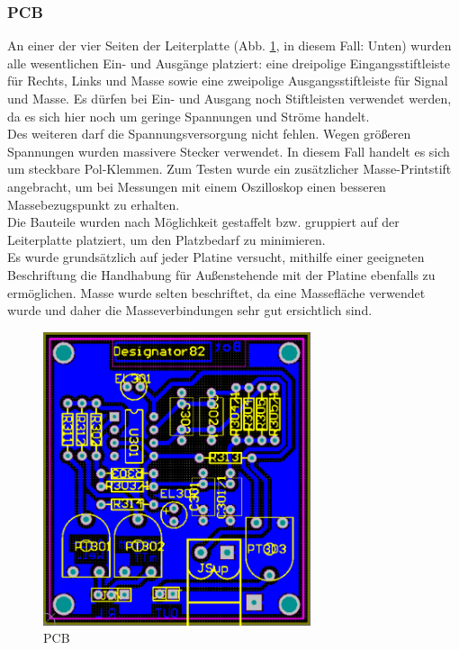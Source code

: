 \subsubsection{PCB}\label{subsec:5.5.3}
An einer der vier Seiten der Leiterplatte (Abb. \ref{fig:5.5.3.1}, in diesem Fall: Unten) wurden alle wesentlichen Ein- und Ausgänge platziert: eine dreipolige Eingangsstiftleiste für Rechts, Links und Masse sowie eine zweipolige Ausgangsstiftleiste für Signal und Masse.
Es dürfen bei Ein- und Ausgang noch Stiftleisten verwendet werden, da es sich hier noch um geringe Spannungen und Ströme handelt.\\
Des weiteren darf die Spannungsversorgung nicht fehlen.
Wegen größeren Spannungen wurden massivere Stecker verwendet.
In diesem Fall handelt es sich um steckbare Pol-Klemmen.
Zum Testen wurde ein zusätzlicher Masse-Printstift angebracht, um bei Messungen mit einem Oszilloskop einen besseren Massebezugspunkt zu erhalten.\\
Die Bauteile wurden nach Möglichkeit gestaffelt bzw. gruppiert auf der Leiterplatte platziert, um den Platzbedarf zu minimieren.\\
Es wurde grundsätzlich auf jeder Platine versucht, mithilfe einer geeigneten Beschriftung die Handhabung für Außenstehende mit der Platine ebenfalls zu ermöglichen. Masse wurde selten beschriftet, da eine Massefläche verwendet wurde und daher die Masseverbindungen sehr gut ersichtlich sind.
\begin{figure} [H]
	\centering
	\includegraphics[width=0.7\textwidth]{img/Print3/3mTTWeicheruAddierer-PCB.PNG}
	\caption{PCB}
	\label {fig:5.5.3.1}
\end{figure}














